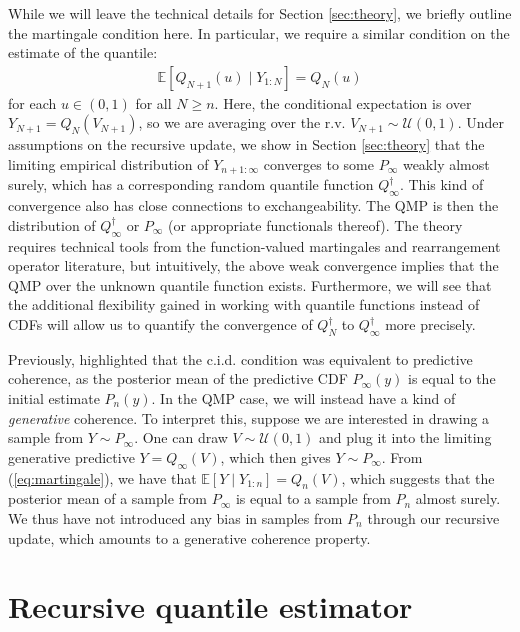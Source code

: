 \documentclass[11pt,a4paper]{article}
\newcommand{\E}{\mathbb{E}}
\begin{document}
While we will leave the technical details for Section \ref{sec:theory}, we briefly outline the martingale condition here. In particular, we require a similar condition on the {estimate} of the quantile:
\begin{align}\label{eq:martingale}
   \E\left[Q_{N+1}(u)  \mid Y_{1:N} \right] = Q_N(u)
\end{align}
for each $u\in (0,1)$ for all $N \geq n$. Here, the conditional expectation is over $Y_{N+1} = Q_N(V_{N+1})$, so we are averaging over the r.v. $V_{N+1}\sim \mathcal{U}(0,1)$. Under assumptions on the recursive update, we show in Section \ref{sec:theory} that the limiting empirical distribution of $Y_{n+1:\infty}$ converges to some $P_\infty$ weakly almost surely, which has a corresponding random quantile function
 $Q_\infty^{\dagger}$. This kind of convergence also has close connections to exchangeability.
The QMP is then the distribution of $Q_\infty^{\dagger}$ or $P_\infty$ (or appropriate functionals thereof). The theory requires technical tools from the function-valued martingales and rearrangement operator literature, but intuitively, the above weak convergence implies that the QMP over the unknown quantile function exists. Furthermore, we will see that the additional flexibility gained in working with quantile functions instead of CDFs will allow us to quantify the convergence of $Q_N^{\dagger}$ to $Q_{\infty}^{\dagger}$ more precisely.

Previously, \cite{Fong2023a} highlighted that the c.i.d. condition was equivalent to predictive coherence, as the posterior mean of the predictive CDF $P_\infty(y)$ is equal to the initial estimate $P_n(y)$. In the QMP case, we will instead have a kind of \textit{generative} coherence. To interpret this, suppose we are interested in drawing a sample from $Y \sim P_{\infty}$. One can draw $V \sim \mathcal{U}(0,1)$ and plug it into the limiting generative predictive $Y= Q_\infty(V)$, which then gives $Y \sim P_\infty$. From (\ref{eq:martingale}), we have that $\E\left[Y \mid Y_{1:n}\right] = Q_n(V)$,
which suggests that the posterior mean of a sample from $P_{\infty}$ is equal to a sample from $P_n$ almost surely. We thus have not introduced any bias in samples from $P_n$ through our recursive update, which amounts to a generative coherence property.

\section{Recursive quantile estimator}\label{sec:recursive}
\end{document}
